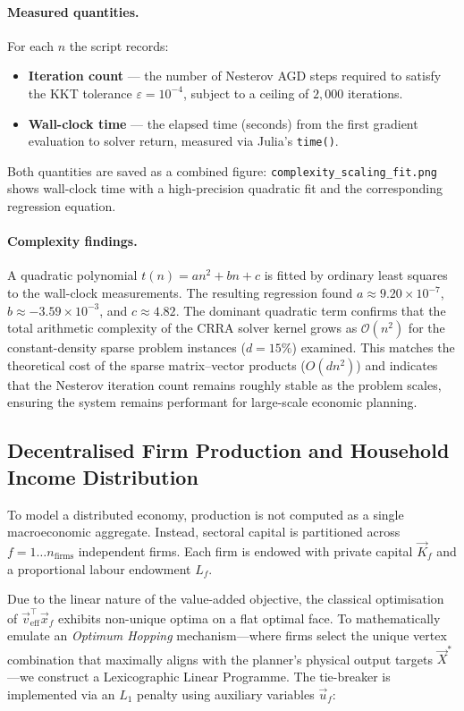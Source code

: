 \paragraph{Measured quantities.}
For each $n$ the script records:
\begin{itemize}
  \item \textbf{Iteration count} --- the number of Nesterov AGD steps required
        to satisfy the KKT tolerance $\varepsilon = 10^{-4}$, subject to a
        ceiling of $2{,}000$ iterations.
  \item \textbf{Wall-clock time} --- the elapsed time (seconds) from the first
        gradient evaluation to solver return, measured via Julia's \texttt{time()}.
\end{itemize}
Both quantities are saved as a combined figure:
\texttt{complexity\_scaling\_fit.png} shows wall-clock time with a high-precision 
quadratic fit and the corresponding regression equation.

\paragraph{Complexity findings.}
A quadratic polynomial $t(n) = a n^2 + b n + c$ is fitted by
ordinary least squares to the wall-clock measurements.
The resulting regression found $a \approx 9.20 \times 10^{-7}$, $b \approx -3.59 \times 10^{-3}$, and $c \approx 4.82$.
The dominant quadratic term confirms that the total arithmetic complexity of the
CRRA solver kernel grows as $\mathcal{O}(n^2)$ for the constant-density sparse problem
instances ($d = 15\%$) examined. This matches the theoretical cost of the
sparse matrix--vector products ($O(d n^2)$) and indicates that the Nesterov iteration count remains roughly stable as the problem scales, 
ensuring the system remains performant for large-scale economic planning.

\subsection{Decentralised Firm Production and Household Income Distribution}

To model a distributed economy, production is not computed as a single macroeconomic aggregate. Instead, sectoral capital is partitioned across $f = 1 \dots n_{\text{firms}}$ independent firms. Each firm is endowed with private capital $\vec{K}_f$ and a proportional labour endowment $L_f$.

Due to the linear nature of the value-added objective, the classical optimisation of $\vec{v}_{\text{eff}}^\top \vec{x}_f$ exhibits non-unique optima on a flat optimal face. To mathematically emulate an \textit{Optimum Hopping} mechanism---where firms select the unique vertex combination that maximally aligns with the planner's physical output targets $\vec{X}^*$---we construct a Lexicographic Linear Programme. The tie-breaker is implemented via an $L_1$ penalty using auxiliary variables $\vec{u}_f$:

